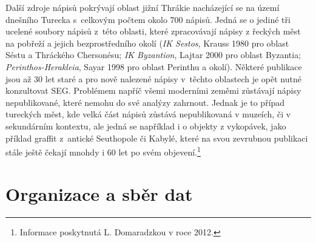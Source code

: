 Další zdroje nápisů pokrývají oblast jižní Thrákie nacházející se na území dnešního Turecka s~celkovým počtem okolo 700 nápisů. Jedná se o jediné tři ucelené soubory nápisů z~této oblasti, které zpracovávají nápisy z řeckých měst na pobřeží a jejich bezprostředního okolí ({\em IK Sestos}, Krauss 1980 pro oblast Séstu a Thráckého Chersonésu; {\em IK Byzantion}, Lajtar 2000 pro oblast Byzantia; {\em Perinthos-Herakleia}, Sayar 1998 pro oblast Perinthu a okolí). Některé publikace jsou až 30 let staré a pro nově nalezené nápisy v~těchto oblastech je opět nutné konzultovat SEG. Problémem napříč všemi moderními zeměmi zůstávají nápisy nepublikované, které nemohu do své analýzy zahrnout. Jednak je to případ tureckých měst, kde velká část nápisů zůstává nepublikovaná v muzeích, či v sekundárním kontextu, ale jedná se například i o objekty z vykopávek, jako příklad graffit z~antické Seuthopole či Kabylé, které na svou zevrubnou publikaci stále ještě čekají mnohdy i 60 let po svém objevení.\footnote{Informace poskytnutá L. Domaradzkou v roce 2012.}

\section[organizace-a-sběr-dat]{Organizace a sběr dat}


